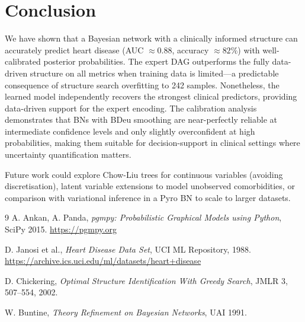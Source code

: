 \documentclass[10pt,twocolumn]{article}
\begin{document}
\section{Conclusion}
We have shown that a Bayesian network with a clinically informed structure
can accurately predict heart disease (AUC $\approx 0.88$, accuracy $\approx 82\%$)
with well-calibrated posterior probabilities. The expert DAG outperforms
the fully data-driven structure on all metrics when training data is
limited---a predictable consequence of structure search overfitting to
242 samples. Nonetheless, the learned model independently recovers the
strongest clinical predictors, providing data-driven support for the
expert encoding. The calibration analysis demonstrates that BNs with
BDeu smoothing are near-perfectly reliable at intermediate confidence
levels and only slightly overconfident at high probabilities, making them
suitable for decision-support in clinical settings where uncertainty
quantification matters.

Future work could explore Chow-Liu trees for continuous variables (avoiding
discretisation), latent variable extensions to model unobserved comorbidities,
or comparison with variational inference in a Pyro BN to scale to larger
datasets.

\begin{thebibliography}{9}
  A. Ankan, A. Panda, \textit{pgmpy: Probabilistic Graphical Models using
  Python}, SciPy 2015. \url{https://pgmpy.org}

  D. Janosi et al., \textit{Heart Disease Data Set}, UCI ML Repository, 1988.
  \url{https://archive.ics.uci.edu/ml/datasets/heart+disease}

  D. Chickering, \textit{Optimal Structure Identification With Greedy Search},
  JMLR 3, 507--554, 2002.

  W. Buntine, \textit{Theory Refinement on Bayesian Networks},
  UAI 1991.
\end{thebibliography}
\end{document}
